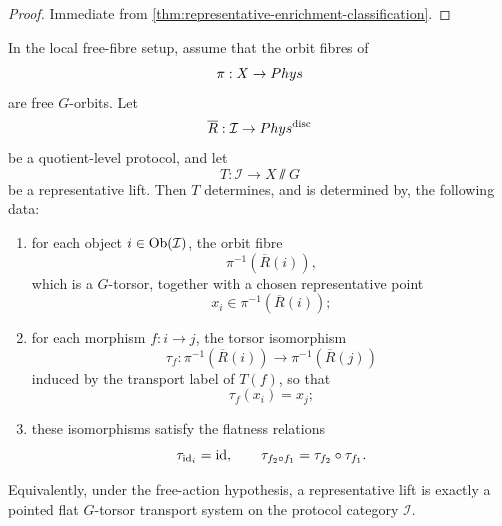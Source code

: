 \begin{proof}
	Immediate from
	\cref{thm:representative-enrichment-classification}.
\end{proof}
\begin{theorem}
	\label{thm:lift-flat-torsor}
	In the local free-fibre setup, assume that the orbit fibres of
	\[
		\pi:X\to Phys
	\]
	are free \(G\)-orbits.  Let
	\[
		\overline R:\mathcal I\to Phys^{\mathrm{disc}}
	\]
	be a quotient-level protocol, and let
	\[
		T:\mathcal I\to X\sslash G
	\]
	be a representative lift.
	Then \(T\) determines, and is determined by, the following data:
	\begin{enumerate}[label=\textup{(\roman*)}]
		\item for each object \(i\in\operatorname{Ob}(\mathcal I)\), the orbit fibre
		      \[
			      \pi^{-1}(\overline R(i)),
		      \]
		      which is a \(G\)-torsor, together with a chosen representative
		      point
		      \[
			      x_i\in \pi^{-1}(\overline R(i));
		      \]
		\item for each morphism \(f:i\to j\), the torsor isomorphism
		      \[
			      \tau_f:\pi^{-1}(\overline R(i))\to \pi^{-1}(\overline R(j))
		      \]
		      induced by the transport label of \(T(f)\), so that
		      \[
			      \tau_f(x_i)=x_j;
		      \]
		\item these isomorphisms satisfy the flatness relations
		      \[
			      \tau_{\operatorname{id}_i}=\operatorname{id},
			      \qquad
			      \tau_{f_2\circ f_1}=\tau_{f_2}\circ\tau_{f_1}.
		      \]
	\end{enumerate}
	Equivalently, under the free-action hypothesis, a representative lift is
	exactly a pointed flat \(G\)-torsor transport system on the protocol
	category \(\mathcal I\).
\end{theorem}
